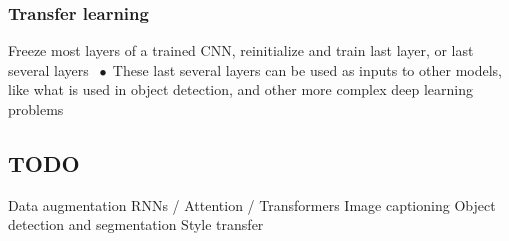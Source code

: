 \documentclass[9pt]{extarticle}
\newcommand*\bspace{$\; \bullet \;$}
\begin{document}
\subsubsection{Transfer learning}
Freeze most layers of a trained CNN, reinitialize and train last layer, or last several layers \bspace These last several layers can be used as inputs to other models, like what is used in object detection, and other more complex deep learning problems



\subsection{TODO}

Data augmentation 
RNNs / Attention / Transformers 
Image captioning
Object detection and segmentation 
Style transfer
\end{document}
